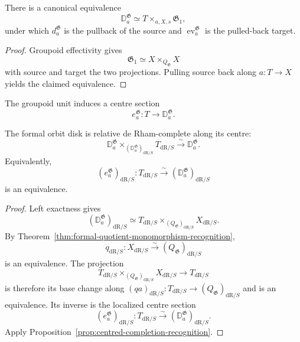 \begin{proposition}
\label{prop:formal-disk-arrow-fibre}
There is a canonical equivalence
\[
    \mathbb D^{\mathfrak G}_a
    \simeq
    T\times_{a,X,s}\mathfrak G_1,
\]
under which $d^{\mathfrak G}_a$ is the pullback of the source and
$\operatorname{ev}^{\mathfrak G}_a$ is the pulled-back target.
\end{proposition}

\begin{proof}
Groupoid effectivity gives
\[
    \mathfrak G_1
    \simeq
    X\times_{Q_{\mathfrak G}}X
\]
with source and target the two projections.  Pulling source back along
$a:T\to X$ yields the claimed equivalence.
\end{proof}

The groupoid unit induces a centre section
\[
    e^{\mathfrak G}_a:
    T\longrightarrow
    \mathbb D^{\mathfrak G}_a.
\]

\begin{proposition}
\label{prop:formal-disk-unitwise-complete}
The formal orbit disk is relative de Rham-complete along its centre:
\[
    \mathbb D^{\mathfrak G}_a
    \times_{
        (\mathbb D^{\mathfrak G}_a)_{\mathrm{dR}/S}
    }
    T_{\mathrm{dR}/S}
    \xrightarrow{\sim}
    \mathbb D^{\mathfrak G}_a.
\]
Equivalently,
\[
    (e^{\mathfrak G}_a)_{\mathrm{dR}/S}:
    T_{\mathrm{dR}/S}
    \xrightarrow{\sim}
    (\mathbb D^{\mathfrak G}_a)_{\mathrm{dR}/S}
\]
is an equivalence.
\end{proposition}

\begin{proof}
Left exactness gives
\[
    (\mathbb D^{\mathfrak G}_a)_{\mathrm{dR}/S}
    \simeq
    T_{\mathrm{dR}/S}
    \times_{(Q_{\mathfrak G})_{\mathrm{dR}/S}}
    X_{\mathrm{dR}/S}.
\]
By Theorem~\ref{thm:formal-quotient-monomorphism-recognition},
\[
    q_{\mathrm{dR}/S}:
    X_{\mathrm{dR}/S}
    \xrightarrow{\sim}
    (Q_{\mathfrak G})_{\mathrm{dR}/S}
\]
is an equivalence.  The projection
\[
    T_{\mathrm{dR}/S}
    \times_{(Q_{\mathfrak G})_{\mathrm{dR}/S}}
    X_{\mathrm{dR}/S}
    \longrightarrow
    T_{\mathrm{dR}/S}
\]
is therefore its base change along
$(qa)_{\mathrm{dR}/S}:T_{\mathrm{dR}/S}\to
(Q_{\mathfrak G})_{\mathrm{dR}/S}$ and is an equivalence.  Its inverse is the
localized centre section
\[
    (e^{\mathfrak G}_a)_{\mathrm{dR}/S}:
    T_{\mathrm{dR}/S}
    \xrightarrow{\sim}
    (\mathbb D^{\mathfrak G}_a)_{\mathrm{dR}/S}.
\]
Apply Proposition~\ref{prop:centred-completion-recognition}.
\end{proof}

